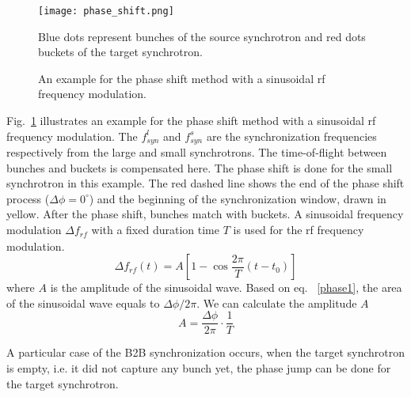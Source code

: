 \begin{figure}[!htb]
   \centering   
   \texttt{[image: phase\_shift.png]}
   \caption{An example for the phase shift method with a sinusoidal rf frequency modulation.}{Blue dots represent bunches of the source synchrotron and red dots buckets of the target synchrotron.}
   \label{phase_shift}
\end{figure}


Fig.~\ref{phase_shift} illustrates an example for the phase shift method with a sinusoidal rf frequency modulation. The $f_{\mathit{syn}}^{l}$ and $f_{\mathit{syn}}^{s}$ are the synchronization frequencies respectively from the large and small synchrotrons. The time-of-flight between bunches and buckets is compensated here. The phase shift is done for the small synchrotron in this example. The red dashed line shows the end of the phase shift process ($\Delta \phi=0^\circ$) and the beginning of the synchronization window, drawn in yellow. After the phase shift, bunches match with buckets. A sinusoidal frequency modulation $\Delta f_{\mathit{rf}}$ with a fixed duration time $T$ is used for the rf frequency modulation.
\begin{equation}
\Delta f_{\mathit{rf}}(t)=A[1-\cos \frac{2\pi}{T}(t-t_0)]
\end{equation}
where $A$ is the amplitude of the sinusoidal wave. Based on eq. ~\ref{phase1}, the area of the sinusoidal wave equals to $\Delta \phi/2\pi$. We can calculate the amplitude $A$  
\begin{equation}
A= \frac{\Delta \phi}{2\pi}\cdot\frac{1}{T}
\end{equation}

A particular case of the B2B synchronization occurs, when the target synchrotron is empty, i.e. it did not capture any bunch yet, the phase jump can be done for the target synchrotron.

